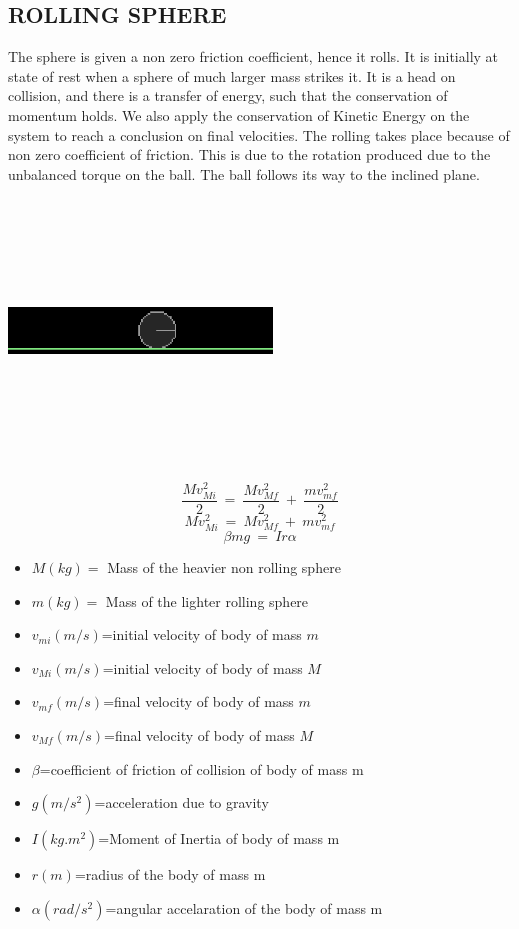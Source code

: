 \documentclass[11 pt]{article}
\begin{document}
\subsection{ROLLING SPHERE}
The sphere is given a non zero friction coefficient, hence it rolls. It is initially at state of rest when a sphere of much larger mass strikes it. It is a head on collision, and there is a transfer of energy, such that the conservation of momentum holds. We also apply the conservation of Kinetic Energy on the system to reach a conclusion on final velocities. The rolling takes place because of non zero coefficient of friction\cite{hrk}. This is due to the rotation produced due to the unbalanced torque on the ball. The ball follows its way to the inclined plane.
\begin{center}\includegraphics[width=7cm, height=7cm]{sphere.eps}\end{center}
\begin{equation} \: \frac{Mv_{Mi}^{2}}{2} \: =  \: \frac{Mv_{Mf}^{2}}{2} \: +  \: \frac{mv_{mf}^{2}}{2} \:  \end{equation}
\begin{equation} \: {Mv_{Mi}^{2}} \: =  \: {Mv_{Mf}^{2}} \: +  \: {mv_{mf}^{2}} \:  \end{equation}
\begin{equation} \: \beta mg \: = \: Ir \alpha \: \end{equation}
\begin{itemize}
\item $M(kg)=$ Mass of the heavier non rolling sphere 
\item $m(kg)=$ Mass of the lighter rolling sphere  
\item $v_{mi}(m/s)$=initial velocity of body of mass $m$ 
\item $v_{Mi}(m/s)$=initial velocity of body of mass $M$
\item $v_{mf}(m/s)$=final velocity of body of mass $m$ 
\item $v_{Mf}(m/s)$=final velocity of body of mass $M$ 
\item $\beta$=coefficient of friction of collision of body of mass m 
\item $g(m/s^{2})$=acceleration due to gravity 
\item $I(kg.m^{2})$=Moment of Inertia of body of mass m 
\item $r(m)$=radius of the body of mass m 
\item $\alpha(rad/s^{2})$=angular accelaration of the body of mass m
\end{itemize}
\end{document}
